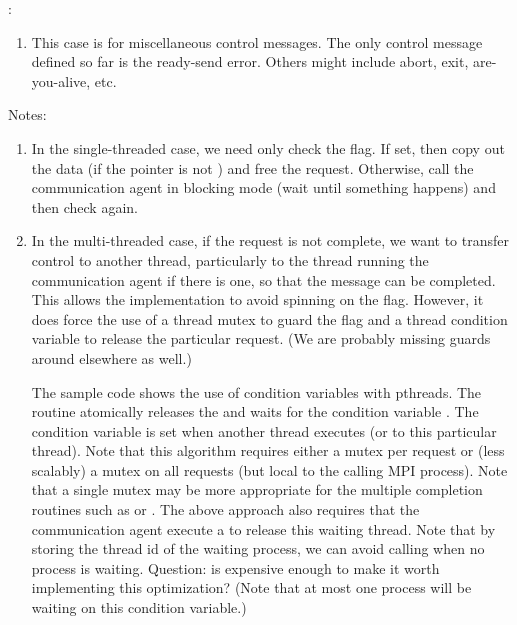 :
\begin{enumerate}
\item This case is for miscellaneous control messages.  The only control
  message defined so far is the ready-send error.  Others might include abort,
  exit, are-you-alive, etc.
\end{enumerate}

\ifcodefirst
\else
{}
\fi


\ifcodefirst
{}
\fi

Notes:
\begin{enumerate}
\item In the single-threaded case, we need only check the
   flag. 
  If set, then copy out the  data (if the 
  pointer is not ) and free the request.  Otherwise, 
  call the communication agent in blocking mode (wait until something happens)
  and then check again.

\item In the multi-threaded case, if the request is not complete, we want to
  transfer control to another thread, particularly to the thread running the
  communication agent if there is one, so that the message can be completed.
  This allows the implementation to avoid spinning on the
   flag.  However, it does force the use of a thread mutex to guard the
   flag and a thread condition variable to release the
  particular request.  (We are probably missing guards around 
  elsewhere as well.)

  The sample code shows the use of condition variables with pthreads.
  The routine  atomically releases the
   and 
  waits for the condition variable .  The condition variable is set
  when another thread executes  (or
   to this particular thread).
  Note that this algorithm requires either a mutex per request or (less
  scalably) a mutex 
  on all requests (but local to the calling MPI process).  
  Note that a single mutex may be more appropriate for the multiple completion
  routines such as  or .
  The above approach also requires that the communication agent execute a
   to release this waiting thread.  Note that by
  storing the thread id of the waiting process, we can avoid calling
   when no process is waiting.  Question: is
   expensive enough to make it worth implementing
  this optimization?  (Note that at most one process will be waiting on this
  condition variable.)


\end{enumerate}

